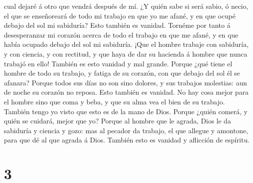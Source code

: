 cual dejaré á otro que vendrá después de mí.  ¿Y quién sabe
si será sabio, ó necio, el que se enseñoreará de todo mi trabajo en que
yo me afané, y en que ocupé debajo del sol mi sabiduría? Esto también es
vanidad.  Tornéme por tanto á desesperanzar mi corazón
acerca de todo el trabajo en que me afané, y en que había ocupado debajo
del sol mi sabiduría.  ¡Que el hombre trabaje con
sabiduría, y con ciencia, y con rectitud, y que haya de dar su hacienda
á hombre que nunca trabajó en ello! También es esto vanidad y mal
grande.  Porque ¿qué tiene el hombre de todo su trabajo, y
fatiga de su corazón, con que debajo del sol él se afanara?
 Porque todos sus días no son sino dolores, y sus trabajos
molestias: aun de noche su corazón no reposa. Esto también es vanidad.
 No hay cosa mejor para el hombre sino que coma y beba, y
que su alma vea el bien de su trabajo. También tengo yo visto que esto
es de la mano de Dios.  Porque ¿quién comerá, y quién se
cuidará, mejor que yo?  Porque al hombre que le agrada,
Dios le da sabiduría y ciencia y gozo: mas al pecador da trabajo, el que
allegue y amontone, para que dé al que agrada á Dios. También esto es
vanidad y aflicción de espíritu.

\hypertarget{section-2}{%
\section{3}\label{section-2}}

